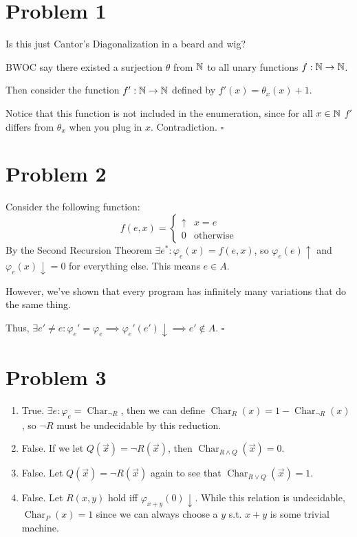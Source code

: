 \documentclass[12pt]{article}
\DeclareMathOperator{\ch}{Char}
\begin{document}
\section{Problem 1}

Is this just Cantor's Diagonalization in a beard and wig?

BWOC say there existed a surjection $\theta$ from $\mathbb{N}$ to all unary functions $f: \mathbb{N} \to \mathbb{N}$.

Then consider the function $f': \mathbb{N} \to \mathbb{N}$ defined by $f'(x)=\theta_x(x)+1$.

Notice that this function is not included in the enumeration, since for all
$x \in \mathbb{N}$ $f'$ differs from $\theta_x$ when you plug in $x$.
Contradiction. $\square$

\section{Problem 2}

Consider the following function:
\[f(e, x)=\begin{cases}
    \uparrow & x=e              \\
    0        & \text{otherwise}
  \end{cases}\]
By the Second Recursion Theorem $\exists e^*: \varphi_e(x)=f(e, x)$,
so $\varphi_e(e)\uparrow$ and $\varphi_e(x)\downarrow=0$ for everything else.
This means $e \in A$.

However, we've shown that every program has infinitely many variations that do the same thing.

Thus, $\exists e' \ne e: \varphi_e'=\varphi_e \implies \varphi_e'(e')\downarrow \implies e' \notin A$. $\square$

\section{Problem 3}

\begin{enumerate}[label=(\alph*)]
  \item True. $\exists e: \varphi_e=\ch_{\lnot R}$, then we can define $\ch_R(x)=1-\ch_{\lnot R}(x)$,
        so $\lnot R$ must be undecidable by this reduction.

  \item False. If we let $Q(\vec{x})=\lnot R(\vec{x})$, then $\ch_{R \land Q}(\vec{x})=0$.

  \item False. Let $Q(\vec{x})=\lnot R(\vec{x})$ again to see that $\ch_{R \lor Q}(\vec{x})=1$.

  \item False. Let $R(x, y)$ hold iff $\varphi_{x+y}(0)\downarrow$.
        While this relation is undecidable, $\ch_P(x)=1$ since we can always choose a $y$ s.t. $x+y$ is some trivial machine.
\end{enumerate}
\end{document}
